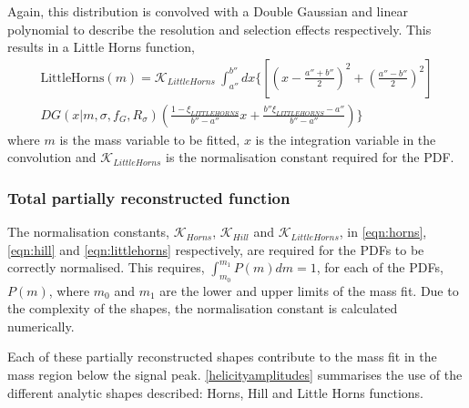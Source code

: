 Again, this distribution is convolved with a Double Gaussian and linear polynomial to describe the resolution and selection effects respectively. This results in a Little Horns function,
\begin{multline}
\text{LittleHorns}(m) = \mathcal{K}_{LittleHorns}\ \int_{a''}^{b''} dx \biggl\{ \left[ \left( x - \frac{a''+b''}{2} \right) ^2 + \left( \frac{a''-b''}{2} \right) ^2 \right] \\
 DG(x|m,\sigma,f_G,R_{\sigma}) \left( \frac{1 - \xi_{LITTLEHORNS}}{b'' - a''}x + \frac{b''\xi_{LITTLEHORNS} - a''}{b'' - a''} \right) \biggr\}
\label{eqn:littlehorns}
\end{multline}
where $m$ is the mass variable to be fitted, $x$ is the integration variable in the convolution and $\mathcal{K}_{LittleHorns}$ is the normalisation constant required for the PDF.

\subsubsection{Total partially reconstructed function}

The normalisation constants, $\mathcal{K}_{Horns}$, $\mathcal{K}_{Hill}$ and $\mathcal{K}_{LittleHorns}$, in \eqns\ref{eqn:horns}, \ref{eqn:hill} and \ref{eqn:littlehorns} respectively, are required for the PDFs to be correctly normalised. This requires, $\int_{m_0}^{m_1} P(m) dm = 1$, for each of the PDFs, $P(m)$, where $m_0$ and $m_1$ are the lower and upper limits of the mass fit. Due to the complexity of the shapes, the normalisation constant is calculated numerically. 

Each of these partially reconstructed shapes contribute to the mass fit in the \Bm mass region below the signal peak. \Tab\ref{helicityamplitudes} summarises the use of the different analytic shapes described: Horns, Hill and Little Horns functions. 

